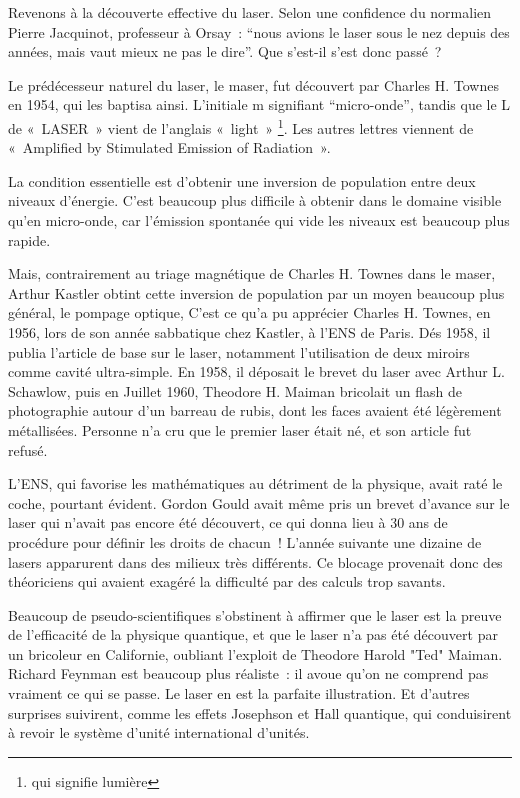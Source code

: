\documentclass[a4paper,12pt]{article}
\begin{document}
Revenons à la découverte effective du laser. Selon une confidence du normalien  Pierre Jacquinot, professeur à Orsay : ``nous avions le laser sous le nez depuis des années, mais vaut mieux ne pas le dire''. Que s'est-il s'est donc passé ?

Le prédécesseur naturel du laser, le maser, fut découvert par Charles H. Townes en 1954, qui les baptisa ainsi. L'initiale m signifiant ``micro-onde'', tandis que le L de « LASER » vient de l'anglais « light » \footnote{qui signifie lumière}. Les autres lettres viennent de « Amplified by Stimulated Emission of Radiation ». 

La condition essentielle est d'obtenir une inversion de population entre deux niveaux d'énergie. C'est beaucoup plus difficile à obtenir dans le domaine visible qu'en micro-onde, car l'émission spontanée qui vide les niveaux est beaucoup plus rapide. 

Mais, contrairement au triage magnétique de Charles H. Townes dans le maser, Arthur Kastler obtint cette inversion de population par un moyen beaucoup plus général, le pompage optique,  C'est ce qu'a pu apprécier Charles H. Townes, en 1956, lors de son année sabbatique  chez Kastler, à l'ENS de Paris. Dés 1958, il publia l'article de base sur le laser, notamment l'utilisation de deux miroirs comme cavité ultra-simple. En 1958, il déposait le brevet du laser avec Arthur L. Schawlow, puis en Juillet 1960, Theodore H. Maiman bricolait un flash de photographie autour d'un barreau de rubis, dont les faces avaient été légèrement métallisées. Personne n'a cru que le premier laser était né, et son article fut refusé. 

L'ENS, qui favorise les mathématiques au détriment de la physique, avait raté le coche, pourtant évident. Gordon Gould avait même pris un brevet d'avance sur le laser qui n'avait pas encore été découvert, ce qui donna lieu à 30 ans de procédure pour définir les droits de chacun ! L'année suivante une dizaine de lasers apparurent dans des milieux très différents. Ce blocage provenait donc des théoriciens qui avaient exagéré la difficulté par des calculs trop savants.

Beaucoup de pseudo-scientifiques s'obstinent à affirmer que le laser est la preuve de l'efficacité de la physique quantique, et que le laser n'a pas été découvert par un bricoleur en Californie, oubliant l'exploit de Theodore Harold "Ted" Maiman. Richard Feynman est beaucoup plus réaliste : il avoue qu'on ne comprend pas vraiment ce qui se passe. Le laser en est la parfaite illustration. Et d'autres surprises suivirent, comme les effets Josephson et Hall quantique, qui conduisirent à revoir le système d'unité international d'unités.
\end{document}

